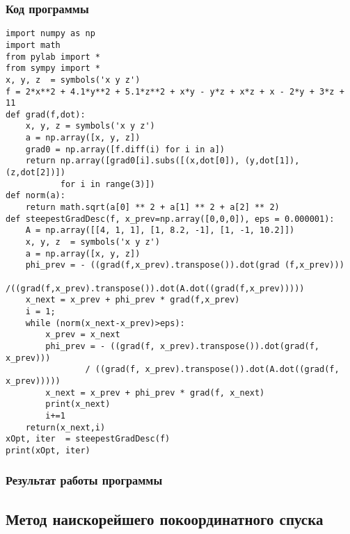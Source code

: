 \documentclass[12pt,a4paper]{article}
\begin{document}
\subsubsection{Код программы}
\begin{verbatim}
import numpy as np
import math
from pylab import *
from sympy import *
x, y, z  = symbols('x y z')
f = 2*x**2 + 4.1*y**2 + 5.1*z**2 + x*y - y*z + x*z + x - 2*y + 3*z + 11
def grad(f,dot):
    x, y, z = symbols('x y z')
    a = np.array([x, y, z])
    grad0 = np.array([f.diff(i) for i in a])
    return np.array([grad0[i].subs([(x,dot[0]), (y,dot[1]), (z,dot[2])]) 
           for i in range(3)])
def norm(a):
    return math.sqrt(a[0] ** 2 + a[1] ** 2 + a[2] ** 2)
def steepestGradDesc(f, x_prev=np.array([0,0,0]), eps = 0.000001):
    A = np.array([[4, 1, 1], [1, 8.2, -1], [1, -1, 10.2]])
    x, y, z  = symbols('x y z')
    a = np.array([x, y, z])
    phi_prev = - ((grad(f,x_prev).transpose()).dot(grad (f,x_prev)))
            /((grad(f,x_prev).transpose()).dot(A.dot((grad(f,x_prev)))))
    x_next = x_prev + phi_prev * grad(f,x_prev)
    i = 1;
    while (norm(x_next-x_prev)>eps):
        x_prev = x_next
        phi_prev = - ((grad(f, x_prev).transpose()).dot(grad(f, x_prev))) 
                / ((grad(f, x_prev).transpose()).dot(A.dot((grad(f, x_prev)))))
        x_next = x_prev + phi_prev * grad(f, x_next)
        print(x_next)
        i+=1
    return(x_next,i)
xOpt, iter  = steepestGradDesc(f)
print(xOpt, iter)
\end{verbatim}
\subsubsection{Результат работы программы}
\subsection{Метод наискорейшего покоординатного спуска}
\end{document}
